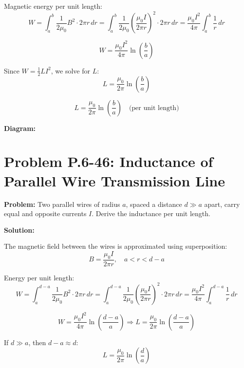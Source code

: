 \documentclass[12pt]{article}
\begin{document}
Magnetic energy per unit length:
\[
W = \int_a^b \frac{1}{2\mu_0} B^2 \cdot 2\pi r \, dr
= \int_a^b \frac{1}{2\mu_0} \left( \frac{\mu_0 I}{2\pi r} \right)^2 \cdot 2\pi r \, dr
= \frac{\mu_0 I^2}{4\pi} \int_a^b \frac{1}{r} \, dr
\]

\[
W = \frac{\mu_0 I^2}{4\pi} \ln\left( \frac{b}{a} \right)
\]

Since \( W = \frac{1}{2} L I^2 \), we solve for \( L \):
\[
L = \frac{\mu_0}{2\pi} \ln\left( \frac{b}{a} \right)
\]

\begin{tcolorbox}
\[
\boxed{L = \frac{\mu_0}{2\pi} \ln\left( \frac{b}{a} \right)} \quad \text{(per unit length)}
\]
\end{tcolorbox}

\textbf{Diagram:}
\begin{center}
\end{center}



\section*{Problem P.6-46: Inductance of Parallel Wire Transmission Line}

\textbf{Problem:}  
Two parallel wires of radius \( a \), spaced a distance \( d \gg a \) apart, carry equal and opposite currents \( I \). Derive the inductance per unit length.

\textbf{Solution:}

The magnetic field between the wires is approximated using superposition:
\[
B = \frac{\mu_0 I}{2\pi r}, \quad a < r < d-a
\]

Energy per unit length:
\[
W = \int_a^{d-a} \frac{1}{2\mu_0} B^2 \cdot 2\pi r \, dr
= \int_a^{d-a} \frac{1}{2\mu_0} \left( \frac{\mu_0 I}{2\pi r} \right)^2 \cdot 2\pi r \, dr
= \frac{\mu_0 I^2}{4\pi} \int_a^{d-a} \frac{1}{r} \, dr
\]

\[
W = \frac{\mu_0 I^2}{4\pi} \ln\left( \frac{d-a}{a} \right)
\Rightarrow L = \frac{\mu_0}{2\pi} \ln\left( \frac{d-a}{a} \right)
\]

If \( d \gg a \), then \( d-a \approx d \):
\[
\boxed{L = \frac{\mu_0}{2\pi} \ln\left( \frac{d}{a} \right)}
\]
\end{document}
